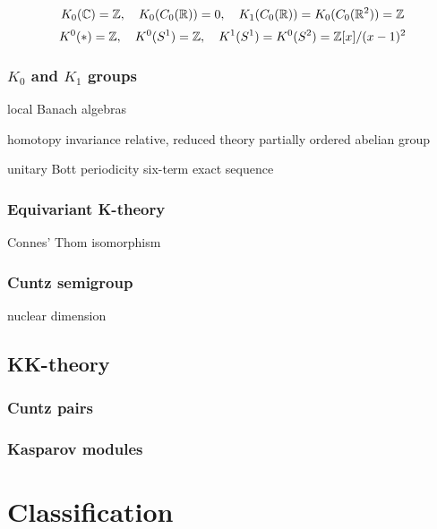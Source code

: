 \documentclass{../../large}
\begin{document}
\[K_0(\mathbb{C})=\mathbb{Z},\quad K_0(C_0(\mathbb{R}))=0,\quad K_1(C_0(\mathbb{R}))=K_0(C_0(\mathbb{R}^2))=\mathbb{Z}\]
\[K^0(*)=\mathbb{Z},\quad K^0(S^1)=\mathbb{Z},\quad K^1(S^1)=K^0(S^2)=\mathbb{Z}[x]/(x-1)^2\]

\section{$K_0$ and $K_1$ groups}

local Banach algebras

homotopy invariance
relative, reduced theory
partially ordered abelian group


unitary
Bott periodicity
six-term exact sequence


\section{Equivariant K-theory}
\begin{prb}
\end{prb}
Connes' Thom isomorphism


\section{Cuntz semigroup}

nuclear dimension




\chapter{KK-theory}

\section{Cuntz pairs}

\section{Kasparov modules}






\chapter{}








\part{Classification}
\end{document}
